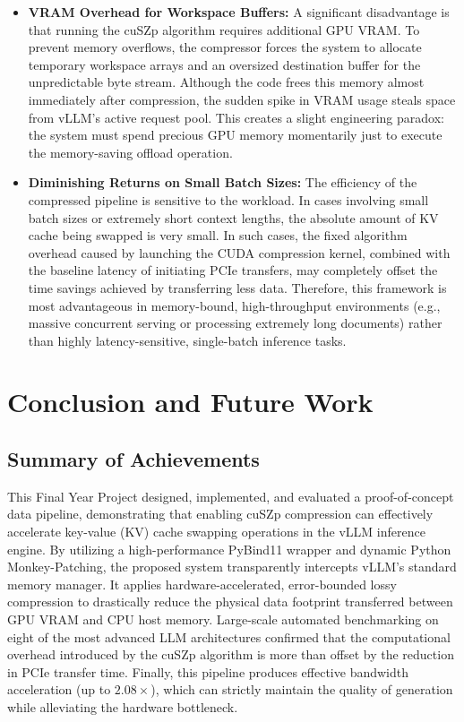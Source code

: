 \documentclass{polyu-comp}
\begin{document}
\begin{itemize}
    \item \textbf{VRAM Overhead for Workspace Buffers:} A significant disadvantage is that running the cuSZp algorithm requires additional GPU VRAM. To prevent memory overflows, the compressor forces the system to allocate temporary workspace arrays and an oversized destination buffer for the unpredictable byte stream. Although the code frees this memory almost immediately after compression, the sudden spike in VRAM usage steals space from vLLM's active request pool. This creates a slight engineering paradox: the system must spend precious GPU memory momentarily just to execute the memory-saving offload operation.
    
    \item \textbf{Diminishing Returns on Small Batch Sizes:} The efficiency of the compressed pipeline is sensitive to the workload. In cases involving small batch sizes or extremely short context lengths, the absolute amount of KV cache being swapped is very small. In such cases, the fixed algorithm overhead caused by launching the CUDA compression kernel, combined with the baseline latency of initiating PCIe transfers, may completely offset the time savings achieved by transferring less data. Therefore, this framework is most advantageous in memory-bound, high-throughput environments (e.g., massive concurrent serving or processing extremely long documents) rather than highly latency-sensitive, single-batch inference tasks.
\end{itemize}


\section{Conclusion and Future Work}
\label{sec:conclusion}

\subsection{Summary of Achievements}
This Final Year Project designed, implemented, and evaluated a proof-of-concept data pipeline, demonstrating that enabling cuSZp compression can effectively accelerate key-value (KV) cache swapping operations in the vLLM inference engine. By utilizing a high-performance PyBind11 wrapper and dynamic Python Monkey-Patching, the proposed system transparently intercepts vLLM's standard memory manager. It applies hardware-accelerated, error-bounded lossy compression to drastically reduce the physical data footprint transferred between GPU VRAM and CPU host memory. Large-scale automated benchmarking on eight of the most advanced LLM architectures confirmed that the computational overhead introduced by the cuSZp algorithm is more than offset by the reduction in PCIe transfer time. Finally, this pipeline produces effective bandwidth acceleration (up to $2.08\times$), which can strictly maintain the quality of generation while alleviating the hardware bottleneck.
\end{document}

